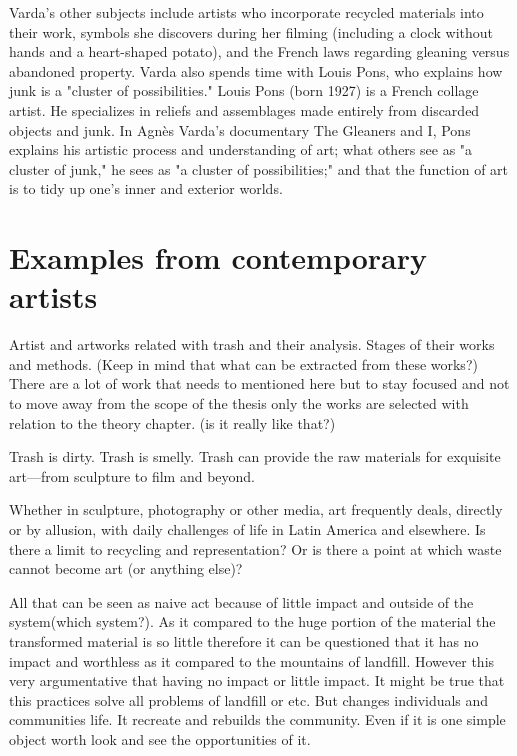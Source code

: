 Varda's other subjects include artists who incorporate recycled materials into their work, symbols she discovers during her filming (including a clock without hands and a heart-shaped potato), and the French laws regarding gleaning versus abandoned property. Varda also spends time with Louis Pons, who explains how junk is a "cluster of possibilities." Louis Pons (born 1927) is a French collage artist. He specializes in reliefs and assemblages made entirely from discarded objects and junk. In Agnès Varda's documentary The Gleaners and I, Pons explains his artistic process and understanding of art; what others see as "a cluster of junk," he sees as "a cluster of possibilities;" and that the function of art is to tidy up one's inner and exterior worlds.

\section{Examples from contemporary artists}
Artist and artworks related with trash and their analysis. Stages of their works and methods. (Keep in mind that what can be extracted from these works?) There are a lot of work that needs to mentioned here but to stay focused and not to move away from the scope of the thesis only the works are selected with relation to the theory chapter. (is it really like that?) 

Trash is dirty. Trash is smelly. Trash can provide the raw materials for exquisite art---from sculpture to film and beyond.

Whether in sculpture, photography or other media, art frequently deals, directly or by allusion, with daily challenges of life in Latin America and elsewhere. Is there a limit to recycling and representation? Or is there a point at which waste cannot become art (or anything else)?

All that can be seen as naive act because of little impact and outside of the system(which system?). As it compared to the huge portion of the material the transformed material is so little therefore it can be questioned that it has no impact and worthless as it compared to the mountains of landfill. However this very argumentative that having no impact or little impact. It might be true that this practices solve all problems of landfill or etc. But changes individuals and communities life. It recreate and rebuilds the community. Even if it is one simple object worth look and see the opportunities of it. 

